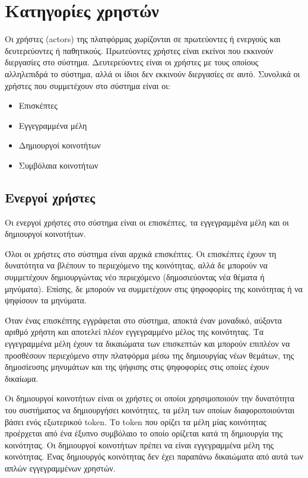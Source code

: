 \section{Κατηγορίες χρηστών} \label{section:3-2-user-categories}

Οι χρήστες (actors) της πλατφόρμας χωρίζονται σε πρωτεύοντες ή ενεργούς και δευτερεύοντες ή παθητικούς. Πρωτεύοντες χρήστες είναι εκείνοι που εκκινούν διεργασίες στο σύστημα. Δευτερεύοντες είναι οι χρήστες με τους οποίους αλληλεπιδρά το σύστημα, αλλά οι ίδιοι δεν εκκινούν διεργασίες σε αυτό. Συνολικά οι χρήστες που συμμετέχουν στο σύστημα είναι οι:

\begin{itemize}
    \item Επισκέπτες
    \item Εγγεγραμμένα μέλη
    \item Δημιουργοί κοινοτήτων %
    \item Συμβόλαια κοινοτήτων
\end{itemize}

\subsection{Ενεργοί χρήστες}

Οι ενεργοί χρήστες στο σύστημα είναι οι επισκέπτες, τα εγγεγραμμένα μέλη και οι δημιουργοί κοινοτήτων.

Όλοι οι χρήστες στο σύστημα είναι αρχικά επισκέπτες. Οι επισκέπτες έχουν τη δυνατότητα να βλέπουν το περιεχόμενο της κοινότητας, αλλά δε μπορούν να συμμετέχουν δημιουργώντας νέο περιεχόμενο (δημοσιεύοντας νέα θέματα ή μηνύματα). Επίσης, δε μπορούν να συμμετέχουν στις ψηφοφορίες της κοινότητας ή να ψηφίσουν τα μηνύματα.

Όταν ένας επισκέπτης εγγράφεται στο σύστημα, αποκτά έναν μοναδικό, αύξοντα αριθμό χρήστη και αποτελεί πλέον εγγεγραμμένο μέλος της κοινότητας. Τα εγγεγραμμένα μέλη έχουν τα δικαιώματα των επισκεπτών και μπορούν επιπλέον να προσθέσουν περιεχόμενο στην πλατφόρμα μέσω της δημιουργίας νέων θεμάτων, της δημοσίευσης μηνυμάτων και της ψήφισης στις ψηφοφορίες στις οποίες έχουν δικαίωμα.

Οι δημιουργοί κοινοτήτων είναι οι χρήστες οι οποίοι χρησιμοποιούν την δυνατότητα του συστήματος να δημιουργήσει κοινότητες, τα μέλη των οποίων διαφοροποιούνται βάσει ενός εξωτερικού token. Το token που ορίζει τα μέλη μίας κοινότητας προέρχεται από ένα έξυπνο συμβόλαιο το οποίο ορίζεται κατά τη δημιουργία της κοινότητας. Οι δημιουργοί κοινοτήτων πρέπει να είναι εγγεγραμμένα μέλη της κοινότητας. Ένας δημιουργός κοινότητας δεν έχει παραπάνω δικαιώματα από αυτά των απλών εγγεγραμμένων χρηστών.


